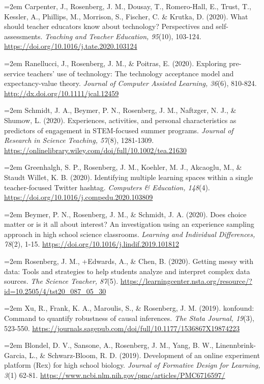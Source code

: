 \documentclass[
  14,
]{article}
\begin{document}
\hangindent=2em Carpenter, J., Rosenberg, J. M., Dousay, T.,
Romero-Hall, E., Trust, T., Kessler, A., Phillips, M., Morrison, S.,
Fischer, C. \& Krutka, D. (2020). What should teacher educators know
about technology? Perspectives and self-assessments. \emph{Teaching and
Teacher Education, 95}(10), 103-124.
\url{https://doi.org/10.1016/j.tate.2020.103124}

\hangindent=2em Ranellucci, J., Rosenberg, J. M., \& Poitras, E. (2020).
Exploring pre-service teachers' use of technology: The technology
acceptance model and expectancy-value theory. \emph{Journal of Computer
Assisted Learning, 36}(6), 810-824.
\url{http://dx.doi.org/10.1111/jcal.12459}

\hangindent=2em Schmidt, J. A., Beymer, P. N., Rosenberg, J. M.,
Naftzger, N. J., \& Shumow, L. (2020). Experiences, activities, and
personal characteristics as predictors of engagement in STEM-focused
summer programs. \emph{Journal of Research in Science Teaching, 57}(8),
1281-1309.
\url{https://onlinelibrary.wiley.com/doi/full/10.1002/tea.21630}

\hangindent=2em Greenhalgh, S. P., Rosenberg, J. M., Koehler, M. J.,
Akcaoglu, M., \& Staudt Willet, K. B. (2020). Identifying multiple
learning spaces within a single teacher-focused Twitter hashtag.
\emph{Computers \& Education, 148}(4).
\url{https://doi.org/10.1016/j.compedu.2020.103809}

\hangindent=2em Beymer, P. N., Rosenberg, J. M., \& Schmidt, J. A.
(2020). Does choice matter or is it all about interest? An investigation
using an experience sampling approach in high school science classrooms.
\emph{Learning and Individual Differences, 78}(2), 1-15.
\url{https://doi.org/10.1016/j.lindif.2019.101812}

\hangindent=2em Rosenberg, J. M., +Edwards, A., \& Chen, B. (2020).
Getting messy with data: Tools and strategies to help students analyze
and interpret complex data sources. \emph{The Science Teacher, 87}(5).
\url{https://learningcenter.nsta.org/resource/?id=10.2505/4/tst20_087_05_30}

\hangindent=2em Xu, R., Frank, K. A., Maroulis, S., \& Rosenberg, J. M.
(2019). konfound: Command to quantify robustness of causal inferences.
\emph{The Stata Journal, 19}(3), 523-550.
\url{https://journals.sagepub.com/doi/full/10.1177/1536867X19874223}

\hangindent=2em Blondel, D. V., Sansone, A., Rosenberg, J. M., Yang, B.
W., Linennbrink-Garcia, L., \& Schwarz-Bloom, R. D. (2019). Development
of an online experiment platform (Rex) for high school biology.
\emph{Journal of Formative Design for Learning, 3}(1) 62-81.
\url{https://www.ncbi.nlm.nih.gov/pmc/articles/PMC6716597/}
\end{document}

